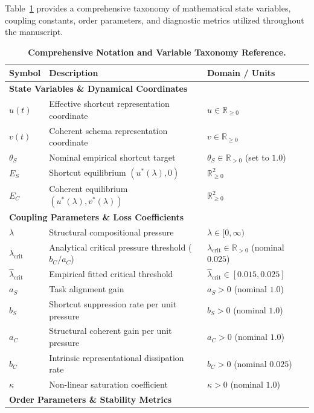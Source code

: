 \documentclass{article}
\theoremstyle{plain}
\theoremstyle{definition}
\begin{document}
Table~\ref{tab:notation_taxonomy} provides a comprehensive taxonomy of mathematical state variables, coupling constants, order parameters, and diagnostic metrics utilized throughout the manuscript.

\begin{table}[h]
\centering
\caption{\textbf{Comprehensive Notation and Variable Taxonomy Reference.}}
\label{tab:notation_taxonomy}
\vskip 0.1in
\begin{small}
\begin{tabular}{lll}
\toprule
Symbol & Description & Domain / Units \\
\midrule
\multicolumn{3}{l}{\textbf{State Variables \& Dynamical Coordinates}} \\
$u(t)$ & Effective shortcut representation coordinate & $u \in \mathbb{R}_{\ge 0}$ \\
$v(t)$ & Coherent schema representation coordinate & $v \in \mathbb{R}_{\ge 0}$ \\
$\theta_S$ & Nominal empirical shortcut target & $\theta_S \in \mathbb{R}_{> 0}$ (set to $1.0$) \\
$E_S$ & Shortcut equilibrium $(u^*(\lambda), 0)$ & $\mathbb{R}_{\ge 0}^2$ \\
$E_C$ & Coherent equilibrium $(u^*(\lambda), v^*(\lambda))$ & $\mathbb{R}_{\ge 0}^2$ \\
\midrule
\multicolumn{3}{l}{\textbf{Coupling Parameters \& Loss Coefficients}} \\
$\lambda$ & Structural compositional pressure & $\lambda \in [0, \infty)$ \\
$\lambda_{\text{crit}}$ & Analytical critical pressure threshold ($b_C / a_C$) & $\lambda_{\text{crit}} \in \mathbb{R}_{> 0}$ (nominal $0.025$) \\
$\hat{\lambda}_{\text{crit}}$ & Empirical fitted critical threshold & $\hat{\lambda}_{\text{crit}} \in [0.015, 0.025]$ \\
$a_S$ & Task alignment gain & $a_S > 0$ (nominal $1.0$) \\
$b_S$ & Shortcut suppression rate per unit pressure & $b_S > 0$ (nominal $1.0$) \\
$a_C$ & Structural coherent gain per unit pressure & $a_C > 0$ (nominal $1.0$) \\
$b_C$ & Intrinsic representational dissipation rate & $b_C > 0$ (nominal $0.025$) \\
$\kappa$ & Non-linear saturation coefficient & $\kappa > 0$ (nominal $1.0$) \\
\midrule
\multicolumn{3}{l}{\textbf{Order Parameters \& Stability Metrics}} \\

\end{tabular}
\end{small}
\end{table}
\end{document}
